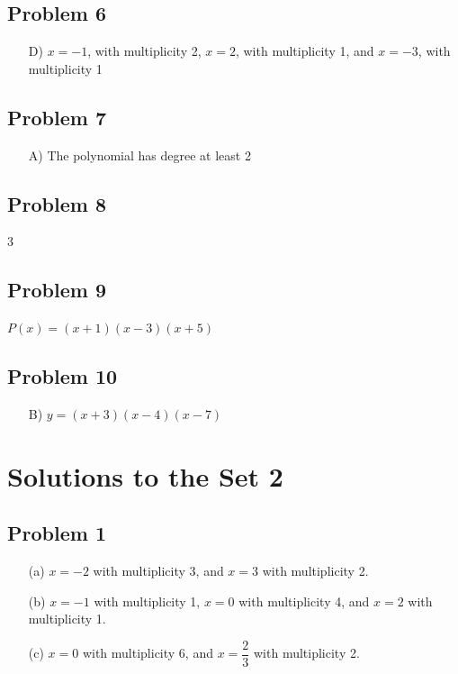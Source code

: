 \documentclass[12pt]{article}
\begin{document}
\subsection*{Problem 6}
\begin{enumerate}
    \item[D)] $x = -1$, with multiplicity 2, $x = 2$, with multiplicity 1, and $x = -3$, with multiplicity 1
\end{enumerate}

\subsection*{Problem 7}
\begin{enumerate}
    \item[A)] The polynomial has degree at least 2
\end{enumerate}

\subsection*{Problem 8}
3

\subsection*{Problem 9}
\(P(x)=(x+1)(x-3)(x+5)\)
\subsection*{Problem 10}
\begin{enumerate}
    \item[B)] $y = (x+3)(x-4)(x-7)$
\end{enumerate}

\section*{Solutions to the Set 2}
\subsection*{Problem 1}
\begin{enumerate}
    \item[(a)] \(x=-2\) with multiplicity 3, and \(x=3\) with multiplicity 2.
    \item[(b)] \(x=-1\) with multiplicity 1, \(x=0\) with multiplicity 4, and \(x=2\) with multiplicity 1.
    \item[(c)] \(x=0\) with multiplicity 6, and \(x=\dfrac{2}{3}\) with multiplicity 2.
\end{enumerate}
\end{document}
